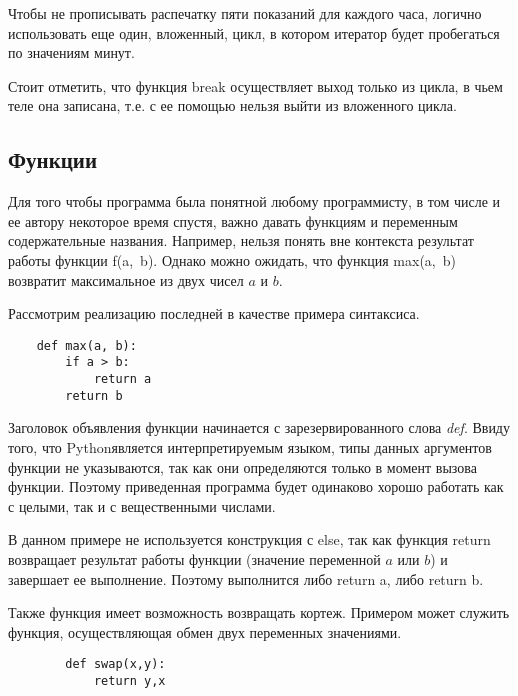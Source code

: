 \documentclass[a4paper, fleqn]{article}
\newcommand*{\py}{Python}
\begin{document}
	Чтобы не прописывать распечатку пяти показаний для каждого часа, логично использовать еще один, вложенный, цикл, в котором итератор будет пробегаться по значениям минут.
	
	Стоит отметить, что функция break осуществляет выход только из цикла, в чьем теле она записана, т.е. с ее помощью нельзя выйти из вложенного цикла.
	
	
	\subsection*{Функции}
	
	Для того чтобы программа была понятной любому программисту, в том числе и ее автору некоторое время спустя, важно давать функциям и переменным содержательные названия. Например, нельзя понять вне контекста результат работы функции f(a,~b). Однако можно ожидать, что функция max(a,~b) возвратит максимальное из двух чисел $a$ и $b$.
	
	Рассмотрим реализацию последней в качестве примера синтаксиса.
	\begin{lstlisting}
	def max(a, b):
		if a > b:
			return a
		return b
	\end{lstlisting}
	
	Заголовок объявления функции начинается с зарезервированного слова \emph{def}. Ввиду того, что \py является интерпретируемым языком, типы данных аргументов функции не указываются, так как они определяются только в момент вызова функции. Поэтому приведенная программа будет одинаково хорошо работать как с целыми, так и с вещественными числами.
	
	В данном примере не используется конструкция с else, так как функция return возвращает результат работы функции (значение переменной $a$ или $b$) и завершает ее выполнение.
	Поэтому выполнится либо return a, либо return b.
	
	Также функция имеет возможность возвращать кортеж. Примером может служить функция, осуществляющая обмен двух переменных значениями.
	
	\begin{lstlisting}
		def swap(x,y):
			return y,x
	\end{lstlisting}
	

	
\end{document}
